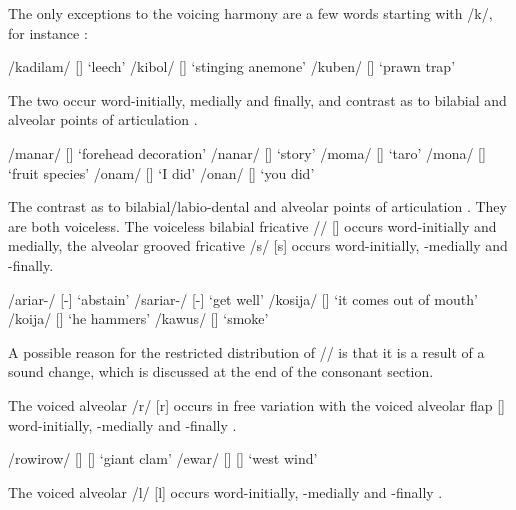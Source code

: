 The only exceptions to the voicing harmony are a few words starting with /k/, for instance :

\newpage
\ea
\label{ex:2:voicingharmonyexceptions}
\ea
/kadilam/  []  `leech'
\ex
/kibol/  []  `stinging anemone'
\ex
/kuben/  []  `prawn trap'
\z
\z

The two  occur word-initially, medially and finally, and contrast as to bilabial and alveolar points of articulation . 

\ea
\label{ex:2:nasals}
\ea
/manar/  []  `forehead decoration'
\ex
/nanar/  []  `story'
\ex
/moma/  []  `taro'
\ex
/mona/  []  `fruit species'
\ex
/onam/  []  `I did'
\ex
/onan/  []  `you did'
\z
\z

The  contrast as to bilabial/labio-dental and alveolar points of articulation . They are both voiceless. The voiceless bilabial fricative /{\textphi}/ [\textipa{\textphi}] occurs word-initially and medially, the alveolar grooved fricative /s/ [s] occurs word-initially, -medially and \nobreakdash-finally. 

\ea
\label{ex:2:fricatives}
\ea
/{\textphi}ariar-/  [-]  `abstain'
\ex
/sariar-/  [-]  `get well'
\ex
/kosija/  []  `it comes out of mouth'
\ex
/ko{\textphi}ija/  []  `he hammers'
\ex
/kawus/  []  `smoke'
\z
\z

A possible reason for the restricted distribution of /{\textphi}/ is that it is a result of a sound change, which is discussed at the end of the consonant section.

The voiced alveolar  /r/ [r] occurs in free variation with the voiced alveolar flap [{\textfishhookr}] word-initially, -medially and -finally .  

\ea
\label{ex:2:trill}
\ea 
/rowirow/  [] {\Tilde} []  `giant clam'
\ex
/ewar/  [] {\Tilde} []  `west wind'
\z
\z

The voiced alveolar  /l/ [l] occurs word-initially, -medially and -finally . 

